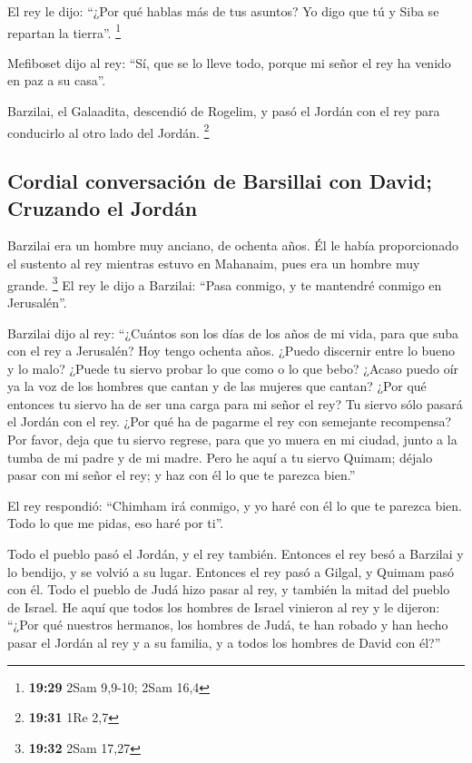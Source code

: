 El rey le dijo: ``¿Por qué hablas más de tus asuntos? Yo
digo que tú y Siba se repartan la tierra''. \footnote{\textbf{19:29}
  2Sam 9,9-10; 2Sam 16,4}

 Mefiboset dijo al rey: ``Sí, que se lo lleve todo,
porque mi señor el rey ha venido en paz a su casa''.

 Barzilai, el Galaadita, descendió de Rogelim, y pasó el
Jordán con el rey para conducirlo al otro lado del Jordán. \footnote{\textbf{19:31}
  1Re 2,7}

\hypertarget{cordial-conversaciuxf3n-de-barsillai-con-david-cruzando-el-jorduxe1n}{%
\subsection{Cordial conversación de Barsillai con David; Cruzando el
Jordán}\label{cordial-conversaciuxf3n-de-barsillai-con-david-cruzando-el-jorduxe1n}}

 Barzilai era un hombre muy anciano, de ochenta años. Él
le había proporcionado el sustento al rey mientras estuvo en Mahanaim,
pues era un hombre muy grande. \footnote{\textbf{19:32} 2Sam 17,27}
 El rey le dijo a Barzilai: ``Pasa conmigo, y te
mantendré conmigo en Jerusalén''.

 Barzilai dijo al rey: ``¿Cuántos son los días de los
años de mi vida, para que suba con el rey a Jerusalén? 
Hoy tengo ochenta años. ¿Puedo discernir entre lo bueno y lo malo?
¿Puede tu siervo probar lo que como o lo que bebo? ¿Acaso puedo oír ya
la voz de los hombres que cantan y de las mujeres que cantan? ¿Por qué
entonces tu siervo ha de ser una carga para mi señor el rey?
 Tu siervo sólo pasará el Jordán con el rey. ¿Por qué ha
de pagarme el rey con semejante recompensa?  Por favor,
deja que tu siervo regrese, para que yo muera en mi ciudad, junto a la
tumba de mi padre y de mi madre. Pero he aquí a tu siervo Quimam; déjalo
pasar con mi señor el rey; y haz con él lo que te parezca bien.''

 El rey respondió: ``Chimham irá conmigo, y yo haré con
él lo que te parezca bien. Todo lo que me pidas, eso haré por ti''.

 Todo el pueblo pasó el Jordán, y el rey también.
Entonces el rey besó a Barzilai y lo bendijo, y se volvió a su lugar.
 Entonces el rey pasó a Gilgal, y Quimam pasó con él.
Todo el pueblo de Judá hizo pasar al rey, y también la mitad del pueblo
de Israel.  He aquí que todos los hombres de Israel
vinieron al rey y le dijeron: ``¿Por qué nuestros hermanos, los hombres
de Judá, te han robado y han hecho pasar el Jordán al rey y a su
familia, y a todos los hombres de David con él?''


